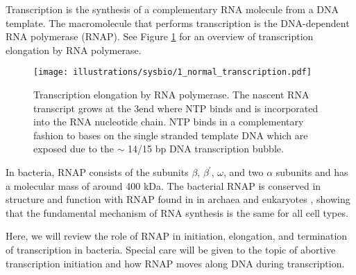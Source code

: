 %
Transcription is the synthesis of a complementary RNA molecule from a DNA
template. The macromolecule that performs transcription is the DNA-dependent
RNA polymerase (RNAP). See Figure \ref{fig:transcription_elongation} for an
overview of transcription elongation by RNA polymerase.

\begin{figure}[htb]
    \begin{center}
        \texttt{[image: illustrations/sysbio/1\_normal\_transcription.pdf]}
    \end{center}
    \caption{Transcription elongation by RNA polymerase. The nascent RNA
    transcript grows at the 3\protect\ppp end where NTP binds and is
    incorporated into the RNA nucleotide chain. NTP binds in a complementary
    fashion to bases on the single stranded template DNA which are exposed due
    to the $\sim$ 14/15 bp DNA transcription bubble.}
    \label{fig:transcription_elongation}
\end{figure}

In bacteria, RNAP consists of the subunits $\beta$, $\beta^{\prime}$, $\omega$,
and two $\alpha$ subunits and has a molecular mass of around 400 kDa. The
bacterial RNAP is conserved in structure and function with RNAP found in in
archaea and eukaryotes \cite{borukhov_rna_2008}, showing that the fundamental
mechanism of RNA synthesis is the same for all cell types.

Here, we will review the role of RNAP in initiation, elongation, and
termination of transcription in bacteria. Special care will be given to the
topic of abortive transcription initiation and how RNAP moves along DNA during
transcription.

